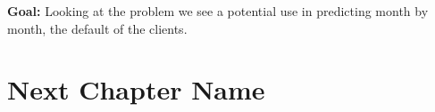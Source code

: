 \documentclass[fleqn,10pt]{SelfArx} %
\begin{document}
	
	\textbf{Goal:}\newline
	Looking at the problem we see a potential use in predicting month by month, the default of the clients.
	
	\section{Next Chapter Name}
	
	
	
	
	
\end{document}
